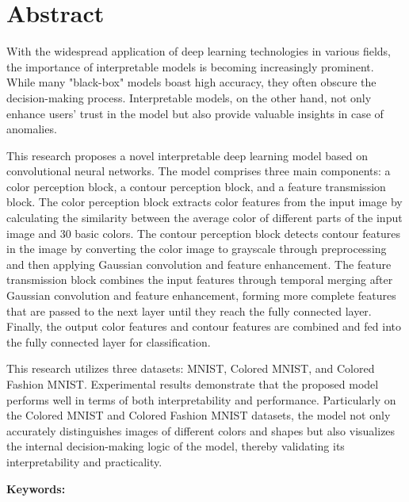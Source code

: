 \documentclass[class=NCU_thesis, crop=false]{standalone}
\begin{document}
\chapter{Abstract}

With the widespread application of deep learning technologies in various fields, the importance of interpretable models is becoming increasingly prominent. While many "black-box" models boast high accuracy, they often obscure the decision-making process. Interpretable models, on the other hand, not only enhance users' trust in the model but also provide valuable insights in case of anomalies.

This research proposes a novel interpretable deep learning model based on convolutional neural networks. The model comprises three main components: a color perception block, a contour perception block, and a feature transmission block. The color perception block extracts color features from the input image by calculating the similarity between the average color of different parts of the input image and 30 basic colors. The contour perception block detects contour features in the image by converting the color image to grayscale through preprocessing and then applying Gaussian convolution and feature enhancement. The feature transmission block combines the input features through temporal merging after Gaussian convolution and feature enhancement, forming more complete features that are passed to the next layer until they reach the fully connected layer. Finally, the output color features and contour features are combined and fed into the fully connected layer for classification.

This research utilizes three datasets: MNIST, Colored MNIST, and Colored Fashion MNIST. Experimental results demonstrate that the proposed model performs well in terms of both interpretability and performance. Particularly on the Colored MNIST and Colored Fashion MNIST datasets, the model not only accurately distinguishes images of different colors and shapes but also visualizes the internal decision-making logic of the model, thereby validating its interpretability and practicality.

\vspace{2em}
\noindent \textbf{Keywords:} \keywordsEn{} %
\end{document}
